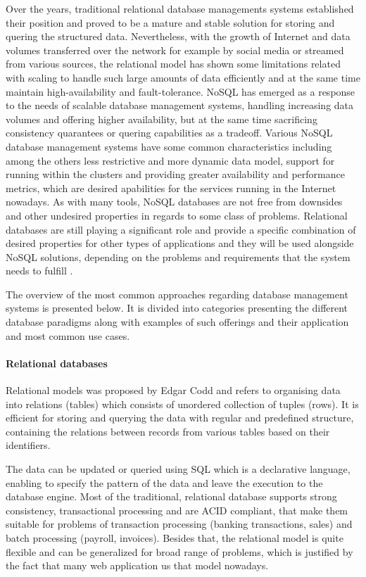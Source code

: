 Over the years, traditional relational database managements systems established their position and proved to be a mature and stable solution for storing and quering the structured data. Nevertheless, with the growth of Internet and data volumes transferred over the network for example by social media or streamed from various sources, the relational model has shown some limitations related with scaling to handle such large amounts of data efficiently and at the same time maintain high-availability and fault-tolerance. NoSQL has emerged as a response to the needs of scalable database management systems, handling increasing data volumes and offering higher availability, but at the same time sacrificing consistency quarantees or quering capabilities as a tradeoff. Various NoSQL database management systems have some common characteristics including among the others less restrictive and more dynamic data model, support for running within the clusters and providing greater availability and performance metrics, which are desired apabilities for the services running in the Internet nowadays. As with many tools, NoSQL databases are not free from downsides and other undesired properties in regards to some class of problems. Relational databases are still playing a significant role and provide a specific combination of desired properties for other types of applications and they will be used alongside NoSQL solutions, depending on the problems and requirements that the system needs to fulfill \cite{FowlerNoSQL}.

The overview of the most common approaches regarding database management systems is presented below. It is divided into categories presenting the different database paradigms along with examples of such offerings and their application and most common use cases.

\paragraph*{Relational databases}

Relational models was proposed by Edgar Codd and refers to organising data into relations (tables) which consists of unordered collection of tuples (rows). It is efficient for storing and querying the data with regular and predefined structure, containing the relations between records from various tables based on their identifiers.

The data can be updated or queried using SQL which is a declarative language, enabling to specify the pattern of the data and leave the execution to the database engine. Most of the traditional, relational database supports strong consistency, transactional processing and are ACID compliant, that make them suitable for problems of transaction processing (banking transactions, sales) and batch processing (payroll, invoices). Besides that, the relational model is quite flexible and can be generalized for broad range of problems, which is justified by the fact that many web application us that model nowadays.

